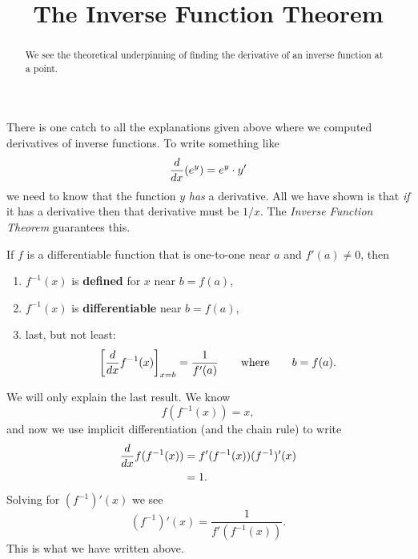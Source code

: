 \documentclass{ximera}
\title[Dig-In:]{The Inverse Function Theorem}
\begin{document}
\begin{abstract}
  We see the theoretical underpinning of finding the derivative of an
  inverse function at a point.
\end{abstract}
\maketitle

There is one catch to all the explanations given above where we
computed derivatives of inverse functions. To write something like
\[
\frac{d}{dx}(e^y)=e^y\cdot y'
\]
we need to know that the function $y$ \textit{has} a derivative. All
we have shown is that \textit{if} it has a derivative then that
derivative must be $1/x$. The \textit{Inverse Function Theorem}
guarantees this.

\begin{theorem}\label{theorem:IFT}
If $f$ is a differentiable function that is one-to-one near $a$ and
$f'(a) \neq 0$, then
\begin{enumerate}
\item $f^{-1}(x)$ is \textbf{defined} for $x$ near $b=f(a)$,
\item $f^{-1}(x)$ is \textbf{differentiable} near $b=f(a)$, 
\item last, but not least:
  \[
  \bigg[ \frac{d}{dx} f^{-1}(x) \bigg]_{x=b}  = \frac{1}{f'(a)}\qquad\text{where}\qquad b = f(a).
  \]
\end{enumerate}
\begin{explanation}
  We will only explain the last result. We know
  \[
  f(f^{-1}(x)) = x,
  \]
  and now we use implicit differentiation (and the chain rule) to
  write
  \begin{align*}
  \frac{d}{dx} f(f^{-1}(x)) &= f'(f^{-1}(x)) (f^{-1})'(x)\\
  &=1.
  \end{align*}
  Solving for $(f^{-1})'(x)$ we see
  \[
  (f^{-1})'(x) = \frac{1}{f'(f^{-1}(x))}.
  \]
  This is what we have written above.
\end{explanation}
\end{theorem}
\end{document}
